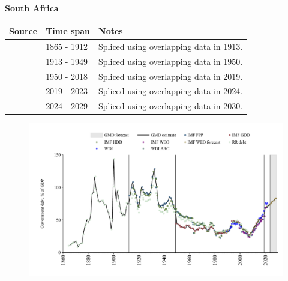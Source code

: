\documentclass[12pt,a4paper,landscape]{article}
\begin{document}
\begin{adjustbox}{max totalsize={\paperwidth}{\paperheight},center}
\begin{minipage}[t][\textheight][t]{\textwidth}
\vspace*{0.5cm}
{}
\begin{center}
{\Large\bfseries South Africa}
\end{center}
\vspace{0.5cm}
\begin{table}[H]
\centering
\small
\begin{tabular}{|l|l|l|}
\hline
\textbf{Source} & \textbf{Time span} & \textbf{Notes} \\
\hline
\rowcolor{white}\cite{RR_debt}& 1865 - 1912 &Spliced using overlapping data in 1913.\\
\rowcolor{lightgray}\cite{IMF_FPP}& 1913 - 1949 &Spliced using overlapping data in 1950.\\
\rowcolor{white}\cite{IMF_GDD}& 1950 - 2018 &Spliced using overlapping data in 2019.\\
\rowcolor{lightgray}\cite{IMF_FPP}& 2019 - 2023 &Spliced using overlapping data in 2024.\\
\rowcolor{white}\cite{IMF_WEO_forecast}& 2024 - 2029 &Spliced using overlapping data in 2030.\\
\hline
\end{tabular}
\end{table}
\begin{figure}[H]
\centering
\includegraphics[width=\textwidth,height=0.6\textheight,keepaspectratio]{graphs/ZAF_govdebt_GDP.pdf}
\end{figure}
\end{minipage}
\end{adjustbox}
\end{document}
